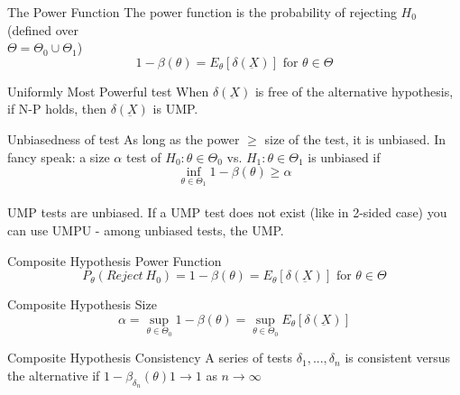 \documentclass[avery5388,grid,frame]{flashcards}
\begin{document}
\begin{flashcard}[Definition]{The Power Function}
\bigskip\bigskip
The power function is the probability of rejecting $H_0$ (defined over \\$\Theta=\Theta_0\cup \Theta_1$)
\begin{equation*}
1-\beta(\theta)=E_\theta[\delta(\underbar{X})] \textrm{  for  }\theta\in\Theta
\end{equation*}
\end{flashcard}
\begin{flashcard}[Definition]{Uniformly Most Powerful test}
\bigskip\bigskip\bigskip
When $\delta(\underbar{X})$ is free of the alternative hypothesis, if N-P holds, then $\delta(\underbar{X})$ is UMP.
\end{flashcard}
\begin{flashcard}[Definition]{Unbiasedness of test}
\bigskip\bigskip\bigskip
As long as the power $\geq$ size of the test, it is unbiased. In fancy speak: a size $\alpha$ test of $H_0:\theta\in\Theta_0$ vs. $H_1:\theta\in\Theta_1$ is unbiased if
\begin{equation*}
\inf_{\theta\in\Theta_1}1-\beta(\theta)\geq\alpha
\end{equation*}
\bigskip\\
UMP tests are unbiased. If a UMP test does not exist (like in 2-sided case) you can use UMPU - among unbiased tests, the UMP.
\end{flashcard}
\begin{flashcard}[Definition]{Composite Hypothesis Power Function}
\bigskip\bigskip\bigskip
\begin{equation*}
P_\theta(Reject\:H_0)=1-\beta(\theta)=E_\theta[\delta(\underbar{X})]\textrm{ for }\theta\in\Theta
\end{equation*}
\end{flashcard}
\begin{flashcard}[Definition]{Composite Hypothesis Size}
\bigskip\bigskip\bigskip
\begin{equation*}
\alpha=\sup_{\theta\in\Theta_0}1-\beta(\theta)=\sup_{\theta\in\Theta_0}E_\theta[\delta(\underbar{X})]
\end{equation*}
\end{flashcard}
\begin{flashcard}[Definition]{Composite Hypothesis Consistency}
\bigskip\bigskip\bigskip
A series of tests $\delta_1,...,\delta_n$ is consistent versus the alternative if $1-\beta_{\delta_n}(\theta)1\rightarrow1$ as $n\rightarrow \infty$
\end{flashcard}
\end{document}
